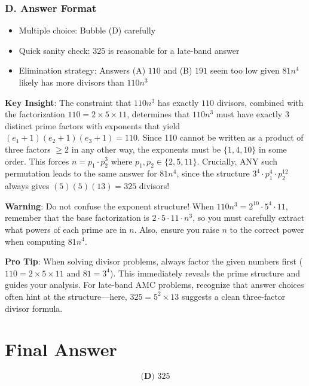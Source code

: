 \documentclass[]{article}
\begin{document}
\begin{competitionbox}
\subsubsection*{D. Answer Format}
\begin{itemize}[leftmargin=*]
    \item Multiple choice: Bubble (D) carefully
    \item Quick sanity check: $325$ is reasonable for a late-band answer
    \item Elimination strategy: Answers (A) $110$ and (B) $191$ seem too low given $81n^4$ likely has more divisors than $110n^3$
\end{itemize}
\end{competitionbox}

\begin{keyinsightbox}
\textbf{Key Insight}: The constraint that $110n^3$ has exactly $110$ divisors, combined with the factorization $110 = 2 \times 5 \times 11$, determines that $110n^3$ must have exactly 3 distinct prime factors with exponents that yield $(e_1+1)(e_2+1)(e_3+1) = 110$. Since 110 cannot be written as a product of three factors $\geq 2$ in any other way, the exponents must be $\{1, 4, 10\}$ in some order. This forces $n = p_1 \cdot p_2^3$ where $p_1, p_2 \in \{2,5,11\}$. Crucially, ANY such permutation leads to the same answer for $81n^4$, since the structure $3^4 \cdot p_1^4 \cdot p_2^{12}$ always gives $(5)(5)(13) = 325$ divisors!
\end{keyinsightbox}

\begin{warningbox}
\textbf{Warning}: Do not confuse the exponent structure! When $110n^3 = 2^{10} \cdot 5^4 \cdot 11$, remember that the base factorization is $2 \cdot 5 \cdot 11 \cdot n^3$, so you must carefully extract what powers of each prime are in $n$. Also, ensure you raise $n$ to the correct power when computing $81n^4$.
\end{warningbox}

\begin{tipbox}
\textbf{Pro Tip}: When solving divisor problems, always factor the given numbers first ($110 = 2 \times 5 \times 11$ and $81 = 3^4$). This immediately reveals the prime structure and guides your analysis. For late-band AMC problems, recognize that answer choices often hint at the structure—here, $325 = 5^2 \times 13$ suggests a clean three-factor divisor formula.
\end{tipbox}

\section*{Final Answer}
\[\boxed{\textbf{(D) } 325}\]
\end{document}
